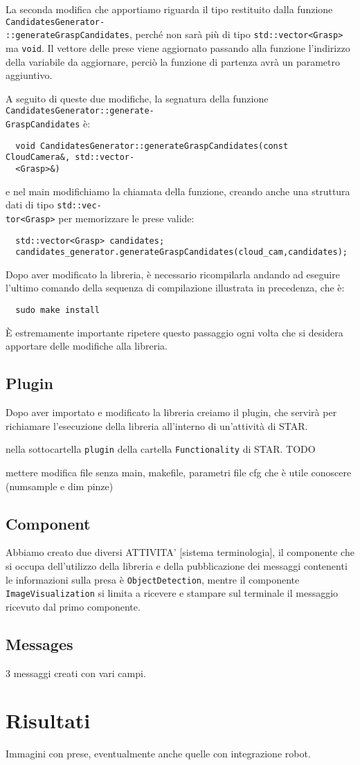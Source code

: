 \documentclass{report}
\begin{document}
La seconda modifica che apportiamo riguarda il tipo restituito dalla funzione \texttt{CandidatesGenerator-}\\\texttt{::generateGraspCandidates}, perché non sarà più di tipo \texttt{std::vector<Grasp>} ma \texttt{void}. Il vettore delle prese viene aggiornato passando alla funzione l'indirizzo della variabile da aggiornare, perciò la funzione di partenza avrà un parametro aggiuntivo. \par 
A seguito di queste due modifiche, la segnatura della funzione \texttt{CandidatesGenerator::generate-}\\\texttt{GraspCandidates} è:
\begin{verbatim}
  void CandidatesGenerator::generateGraspCandidates(const CloudCamera&, std::vector-
  <Grasp>&)
\end{verbatim}
e nel main modifichiamo la chiamata della funzione, creando anche una struttura dati di tipo \texttt{std::vec-}\\\texttt{tor<Grasp>} per memorizzare le prese valide:
\begin{verbatim}
  std::vector<Grasp> candidates;
  candidates_generator.generateGraspCandidates(cloud_cam,candidates);
\end{verbatim}
Dopo aver modificato la libreria, è necessario ricompilarla andando ad eseguire l'ultimo comando della sequenza di compilazione illustrata in precedenza, che è: 
\begin{verbatim}
  sudo make install
\end{verbatim}
È estremamente importante ripetere questo passaggio ogni volta che si desidera apportare delle modifiche alla libreria.
\section{Plugin}
Dopo aver importato e modificato la libreria creiamo il plugin, che servirà per richiamare l'esecuzione della libreria all'interno di un'attività di STAR. \par
nella sottocartella \texttt{plugin} della cartella \texttt{Functionality} di STAR. TODO  \par
mettere modifica file senza main, makefile, parametri file cfg che è utile conoscere (numsample e dim pinze)
\section{Component}
Abbiamo creato due diversi ATTIVITA' [sistema terminologia], il componente che si occupa dell'utilizzo della libreria e della pubblicazione dei messaggi contenenti le informazioni sulla presa è \texttt{ObjectDetection}, mentre il componente \texttt{ImageVisualization} si limita a ricevere e stampare sul terminale il messaggio ricevuto dal primo componente.
\section{Messages}
3 messaggi creati con vari campi.

\newpage
\chapter{Risultati}\label{risultati}
Immagini con prese, eventualmente anche quelle con integrazione robot.
\end{document}
